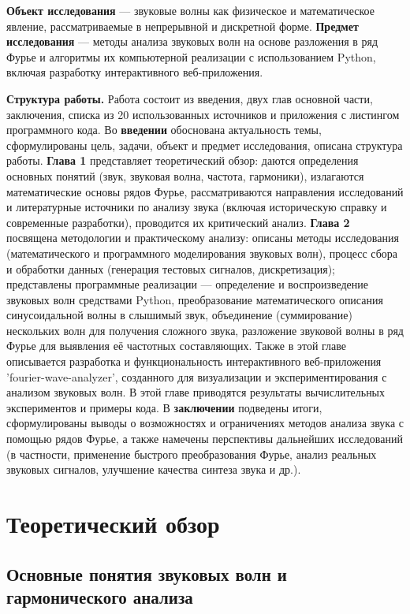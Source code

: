 \documentclass[bachelor, och, diploma]{SCWorks}
\begin{document}
\textbf{Объект исследования} --- звуковые волны как физическое и математическое явление, рассматриваемые в непрерывной и дискретной форме. \textbf{Предмет исследования} --- методы анализа звуковых волн на основе разложения в ряд Фурье и алгоритмы их компьютерной реализации с использованием Python, включая разработку интерактивного веб-приложения.

\textbf{Структура работы.} Работа состоит из введения, двух глав основной части, заключения, списка из 20 использованных источников и приложения с листингом программного кода. Во \textbf{введении} обоснована актуальность темы, сформулированы цель, задачи, объект и предмет исследования, описана структура работы. \textbf{Глава 1} представляет теоретический обзор: даются определения основных понятий (звук, звуковая волна, частота, гармоники), излагаются математические основы рядов Фурье, рассматриваются направления исследований и литературные источники по анализу звука (включая историческую справку и современные разработки), проводится их критический анализ. \textbf{Глава 2} посвящена методологии и практическому анализу: описаны методы исследования (математического и программного моделирования звуковых волн), процесс сбора и обработки данных (генерация тестовых сигналов, дискретизация); представлены программные реализации --- определение и воспроизведение звуковых волн средствами Python, преобразование математического описания синусоидальной волны в слышимый звук, объединение (суммирование) нескольких волн для получения сложного звука, разложение звуковой волны в ряд Фурье для выявления её частотных составляющих. Также в этой главе описывается разработка и функциональность интерактивного веб-приложения 'fourier-wave-analyzer', созданного для визуализации и экспериментирования с анализом звуковых волн. В этой главе приводятся результаты вычислительных экспериментов и примеры кода. В \textbf{заключении} подведены итоги, сформулированы выводы о возможностях и ограничениях методов анализа звука с помощью рядов Фурье, а также намечены перспективы дальнейших исследований (в частности, применение быстрого преобразования Фурье, анализ реальных звуковых сигналов, улучшение качества синтеза звука и др.).

\section{Теоретический обзор}

\subsection{Основные понятия звуковых волн и гармонического анализа}
\end{document}
